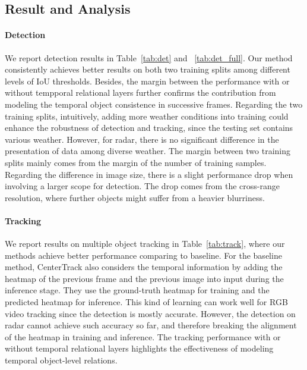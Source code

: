 \documentclass[10pt,twocolumn,letterpaper]{article}
\begin{document}
\subsection{Result and Analysis}

\paragraph{Detection} We report detection results in Table~\ref{tab:det} and ~\ref{tab:det_full}. Our method consistently achieves better results on both two training splits among different levels of IoU thresholds. Besides, the margin between the performance with or without tempporal relational layers further confirms the contribution from modeling the temporal object consistence in successive frames. Regarding the two training splits, intuitively, adding more weather conditions into training could enhance the robustness of detection and tracking, since the testing set contains various weather. However, for radar, there is no significant difference in the presentation of data among diverse weather. The margin between two training splits mainly comes from the margin of the number of training samples. Regarding the difference in image size, there is a slight performance drop when involving a larger scope for detection. The drop comes from the cross-range resolution, where further objects might suffer from a heavier blurriness.

\vspace{-4mm}
\paragraph{Tracking} We report results on multiple object tracking in Table~\ref{tab:track}, where our methods achieve better performance comparing to baseline. For the baseline method, CenterTrack also considers the temporal information by adding the heatmap of the previous frame and the previous image into input during the inference stage. They use the ground-truth heatmap for training and the predicted heatmap for inference. This kind of learning can work well for RGB video tracking since the detection is mostly accurate. However, the detection on radar cannot achieve such accuracy so far, and therefore breaking the alignment of the heatmap in training and inference. The tracking performance with or without temporal relational layers highlights the effectiveness of modeling temporal object-level relations.

\vspace{-4mm}
\end{document}
